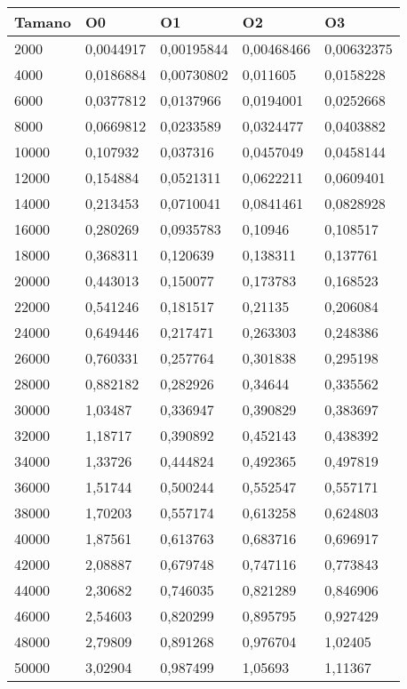 \begin{tabular}{|l|l|l|l|l|}
	\hline
	Tamano & O0 & O1 & O2 & O3 \\
	\hline
	\hline
	2000 & 0,0044917 & 0,00195844 & 0,00468466 & 0,00632375 \\
	\hline
	4000 & 0,0186884 & 0,00730802 & 0,011605 & 0,0158228 \\
	\hline
	6000 & 0,0377812 & 0,0137966 & 0,0194001 & 0,0252668 \\
	\hline
	8000 & 0,0669812 & 0,0233589 & 0,0324477 & 0,0403882 \\
	\hline
	10000 & 0,107932 & 0,037316 & 0,0457049 & 0,0458144 \\
	\hline
	12000 & 0,154884 & 0,0521311 & 0,0622211 & 0,0609401 \\
	\hline
	14000 & 0,213453 & 0,0710041 & 0,0841461 & 0,0828928 \\
	\hline
	16000 & 0,280269 & 0,0935783 & 0,10946 & 0,108517 \\
	\hline
	18000 & 0,368311 & 0,120639 & 0,138311 & 0,137761 \\
	\hline
	20000 & 0,443013 & 0,150077 & 0,173783 & 0,168523 \\
	\hline
	22000 & 0,541246 & 0,181517 & 0,21135 & 0,206084 \\
	\hline
	24000 & 0,649446 & 0,217471 & 0,263303 & 0,248386 \\
	\hline
	26000 & 0,760331 & 0,257764 & 0,301838 & 0,295198 \\
	\hline
	28000 & 0,882182 & 0,282926 & 0,34644 & 0,335562 \\
	\hline
	30000 & 1,03487 & 0,336947 & 0,390829 & 0,383697 \\
	\hline
	32000 & 1,18717 & 0,390892 & 0,452143 & 0,438392 \\
	\hline
	34000 & 1,33726 & 0,444824 & 0,492365 & 0,497819 \\
	\hline
	36000 & 1,51744 & 0,500244 & 0,552547 & 0,557171 \\
	\hline
	38000 & 1,70203 & 0,557174 & 0,613258 & 0,624803 \\
	\hline
	40000 & 1,87561 & 0,613763 & 0,683716 & 0,696917 \\
	\hline
	42000 & 2,08887 & 0,679748 & 0,747116 & 0,773843 \\
	\hline
	44000 & 2,30682 & 0,746035 & 0,821289 & 0,846906 \\
	\hline
	46000 & 2,54603 & 0,820299 & 0,895795 & 0,927429 \\
	\hline
	48000 & 2,79809 & 0,891268 & 0,976704 & 1,02405 \\
	\hline
	50000 & 3,02904 & 0,987499 & 1,05693 & 1,11367 \\
	\hline
\end{tabular}
